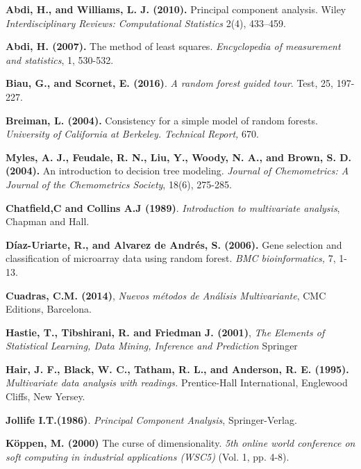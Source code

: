 
\begin{thebibliography}{99}
	

 \textbf{Abdi, H., and Williams, L. J. (2010).} Principal component analysis. Wiley \emph{Interdisciplinary Reviews: Computational Statistics}  2(4), 433–459. 

\textbf{Abdi, H. (2007).} The method of least squares. \emph{Encyclopedia of measurement and statistics}, 1, 530-532.

\textbf{Biau, G., and Scornet, E. (2016)}. \textit{A random forest guided tour}. Test, 25, 197-227.

\textbf{Breiman, L. (2004).} Consistency for a simple model of random forests. \emph{University of California at Berkeley. Technical Report,} 670.

 \textbf{Myles, A. J., Feudale, R. N., Liu, Y., Woody, N. A., and Brown, S. D. (2004).} An introduction to decision tree modeling. \emph{Journal of Chemometrics: A Journal of the Chemometrics Society}, 18(6), 275-285.

 \textbf{Chatfield,C and Collins A.J (1989)}. {\em Introduction to multivariate analysis}, Chapman and Hall.

\textbf{Díaz-Uriarte, R., and Alvarez de Andrés, S. (2006).} Gene selection and classification of microarray data using random forest. \emph{BMC bioinformatics,} 7, 1-13.

 \textbf{Cuadras, C.M. (2014)}, \textit{Nuevos métodos de Análisis Multivariante}, CMC Editions, Barcelona. 

 \textbf{Hastie, T., Tibshirani, R. and Friedman J. (2001)}, \textit{The Elements of Statistical Learning, Data Mining, Inference and Prediction} Springer 

\textbf{Hair, J. F., Black, W. C., Tatham, R. L., and Anderson, R. E. (1995).}
\textit{ Multivariate data analysis with readings.} Prentice-Hall International, Englewood Cliffs, New Yersey. 


 \textbf{Jollife I.T.(1986)}. \emph{Principal Component Analysis}, Springer-Verlag.

 \textbf{Köppen, M. (2000)} The curse of dimensionality. \textit{5th online world conference on soft computing in industrial applications (WSC5)}  (Vol. 1, pp. 4-8).



\end{thebibliography}
